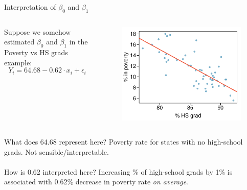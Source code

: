 \documentclass{beamer}
\begin{document}
\begin{frame}{Interpretation of $\beta_0$ and $\beta_1$}
\begin{columns}
\begin{column}{.5\textwidth}
Suppose we somehow estimated $\beta_0$ and $\beta_1$ in the Poverty vs HS grads example:
$$
Y_i=64.68-0.62\cdot x_i + \epsilon_i
$$
\end{column}
\begin{column}{.5\textwidth}
\begin{figure}
    \centering
    \includegraphics[width=\textwidth]{plots/poverty_hsgrad_line.pdf}
\end{figure}
\end{column}
\end{columns}
\vfill

\pause What does 64.68 represent here? \pause Poverty rate for states with no high-school grads. Not sensible/interpretable.\\~\\

\pause How is 0.62 interpreted here? \pause Increasing \% of high-school grads by 1\% is associated with 0.62\% decrease in poverty rate \textit{on average}.
\end{frame}
\end{document}
